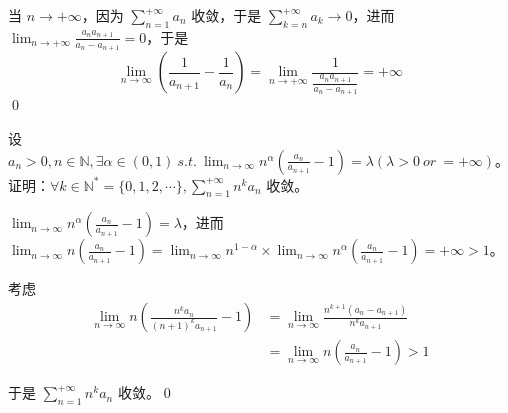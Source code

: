 当 $\displaystyle n\rightarrow +\infty $，因为 $\displaystyle \sum _{n=1}^{+\infty } a_{n}$ 收敛，于是 $\displaystyle \sum _{k=n}^{+\infty } a_{k}\rightarrow 0$，进而 $\displaystyle \lim _{n\rightarrow +\infty }\frac{a_{n} a_{n+1}}{a_{n} -a_{n+1}} =0$，于是
\begin{equation*}
	\lim _{n\rightarrow \infty }\left(\frac{1}{a_{n+1}} -\frac{1}{a_{n}}\right) =\lim _{n\rightarrow +\infty }\frac{1}{\frac{a_{n} a_{n+1}}{a_{n} -a_{n+1}}} =+\infty 
\end{equation*}
\qed 



\begin{ques}
	设 $\displaystyle a_{n}  >0,n\in \mathbb{N} ,\exists \alpha \in ( 0,1) \ s.t.\ \lim _{n\rightarrow \infty } n^{\alpha }\left(\frac{a_{n}}{a_{n+1}} -1\right) =\lambda ( \lambda  >0\ or\ =+\infty )$。证明：$\displaystyle \forall k\in \mathbb{N}^{*} =\{0,1,2,\cdots \} ,\sum _{n=1}^{+\infty } n^{k} a_{n}$ 收敛。
\end{ques}



$\displaystyle \lim _{n\rightarrow \infty } n^{\alpha }\left(\frac{a_{n}}{a_{n+1}} -1\right) =\lambda $，进而 $\displaystyle \lim _{n\rightarrow \infty } n\left(\frac{a_{n}}{a_{n+1}} -1\right) =\lim _{n\rightarrow \infty } n^{1-\alpha } \times \lim _{n\rightarrow \infty } n^{\alpha }\left(\frac{a_{n}}{a_{n+1}} -1\right) =+\infty  >1$。

考虑
\begin{align*}
	\lim _{n\rightarrow \infty } n\left(\frac{n^{k} a_{n}}{( n+1)^{k} a_{n+1}} -1\right) & =\lim _{n\rightarrow \infty }\frac{n^{k+1}( a_{n} -a_{n+1})}{n^{k} a_{n+1}}\\
	& =\lim _{n\rightarrow \infty } n\left(\frac{a_{n}}{a_{n+1}} -1\right)  >1
\end{align*}

于是 $\displaystyle \sum _{n=1}^{+\infty } n^{k} a_{n}$ 收敛。\qed 
\ifx\allfiles\undefined

\fi